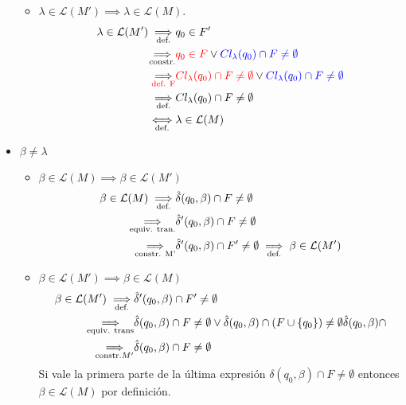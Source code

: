 \begin{itemize}
\begin{itemize}
          \item \(\lambda\in\mathcal{L}(M') \implies \lambda\in\mathcal{L}(M)\).
                \begin{align*}
                  \lambda\in \mathcal{L}(M')  \underset{\text{def.}}{\implies} & q_0\in F'                                                                                \\
                  \underset{\text{constr.}}{\implies}                          & {\color{red}q_0\in F} \lor {\color{blue}Cl_\lambda(q_0)\cap F \neq\emptyset}                           \\
                  \underset{\text{{\color{red}def. F}}}{\implies}                     & {\color{red}Cl_\lambda(q_0)\cap F \neq\emptyset}\lor {\color{blue}Cl_\lambda(q_0)\cap F \neq\emptyset} \\
                  \underset{\text{def.}}{\implies}                             & Cl_\lambda(q_0)\cap F \neq\emptyset                                                      \\
                  \underset{\text{def.}}{\iff}                              & \lambda\in\mathcal{L}(M)                                                                 \\
                \end{align*}
        \end{itemize}
  \item \(\beta \neq \lambda\)
        \begin{itemize}
          \item \(\beta\in\mathcal{L}(M) \implies \beta\in\mathcal{L}(M')\)
                \begin{align*}
                  \beta\in \mathcal{L}(M)  \underset{\text{def.}}{\implies} & \hat\delta(q_0,\beta)\cap F \neq \emptyset                                                             \\
                  \underset{\text{equiv. tran.}}{\implies}                  & \hat\delta'(q_0,\beta)\cap F \neq\emptyset                                                             \\
                  \underset{\text{constr. M'}}{\implies}                    & \hat\delta'(q_0,\beta)\cap F' \neq \emptyset \underset{\text{def.}}{\implies} \beta\in \mathcal{L}(M')
                \end{align*}
          \item \(\beta\in\mathcal{L}(M') \implies \beta\in\mathcal{L}(M)\)
                \begin{align*}
                  \beta\in \mathcal{L}(M') \underset{\text{def.}}{\implies}  & \hat\delta'(q_0,\beta)\cap F' \neq \emptyset                                                          \\
                  \underset{\text{equiv. trans}}{\implies}                   & \hat\delta(q_0,\beta)\cap F \neq \emptyset\lor \hat\delta(q_0,\beta)\cap(F\cup\{q_0\}) \neq \emptyset
                  \hat\delta(q_0,\beta) \cap
                  \\
                  \underset{\text{constr.} M'}{\implies} & \hat\delta(q_0,\beta)\cap F \neq \emptyset
                \end{align*}
                Si vale la primera parte de la última expresión \(\delta(q_0,\beta)\cap F \neq \emptyset\) entonces \(\beta\in \mathcal{L}(M)\) por definición.


\end{itemize}
\end{itemize}
